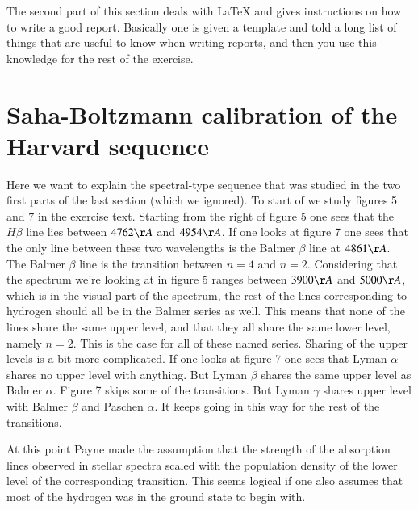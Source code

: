 \documentclass{aa}   %
\begin{document}
The second part of this section deals with LaTeX and gives instructions on how to write a good report.
Basically one is given a template and told a long list of things that are useful to know when writing reports, and then you use this knowledge for the rest of the exercise.



\section{Saha-Boltzmann calibration of the Harvard sequence}   \label{sec:Saha}
Here we want to explain the spectral-type sequence that was studied in the two first parts of the last section (which we ignored).
To start of we study figures 5 and 7 in the exercise text. 
Starting from the right of figure 5 one sees that the $H\beta$ line lies between $4762 \AA$ and $4954 \AA$. 
If one looks at figure 7 one sees that the only line between these two wavelengths is the Balmer $\beta$ line at $4861 \AA$. The Balmer $\beta$ line is the transition between $n = 4$ and $n = 2$. 
Considering that the spectrum we're looking at in figure 5 ranges between $3900 \AA$ and $5000 \AA$, which is in the visual part of the spectrum, the rest of the lines corresponding to hydrogen should all be in the Balmer series as well. 
This means that none of the lines share the same upper level, and that they all share the same lower level, namely $n = 2$.
This is the case for all of these named series. Sharing of the upper levels is a bit more complicated. 
If one looks at figure 7 one sees that Lyman $\alpha$ shares no upper level with anything. 
But Lyman $\beta$ shares the same upper level as Balmer $\alpha$. 
Figure 7 skips some of the transitions. 
But Lyman $\gamma$ shares upper level with Balmer $\beta$ and Paschen $\alpha$. 
It keeps going in this way for the rest of the transitions.

At this point Payne made the assumption that the strength of the absorption lines observed in stellar spectra scaled with the population density of the lower level of the corresponding transition. 
This seems logical if one also assumes that most of the hydrogen was in the ground state to begin with.
\end{document}
